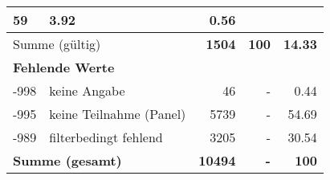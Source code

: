 \begin{longtable}{lXrrr}
       \num{59} &
       \num[round-mode=places,round-precision=2]{3,92} &
         \num[round-mode=places,round-precision=2]{0,56} \\
     \midrule
     \multicolumn{2}{l}{Summe (gültig)} &
       \textbf{\num{1504}} &
     \textbf{100} &
       \textbf{\num[round-mode=places,round-precision=2]{14,33}} \\
     \multicolumn{5}{l}{\textbf{Fehlende Werte}}\\
       -998 &
       keine Angabe &
         \num{46} &
        - &
         \num[round-mode=places,round-precision=2]{0,44} \\
       -995 &
       keine Teilnahme (Panel) &
         \num{5739} &
        - &
         \num[round-mode=places,round-precision=2]{54,69} \\
       -989 &
       filterbedingt fehlend &
         \num{3205} &
        - &
         \num[round-mode=places,round-precision=2]{30,54} \\
     \midrule
     \multicolumn{2}{l}{\textbf{Summe (gesamt)}} &
          \textbf{\num{10494}} &
        \textbf{-} &
        \textbf{100} \\
     \bottomrule
     \end{longtable}
     
